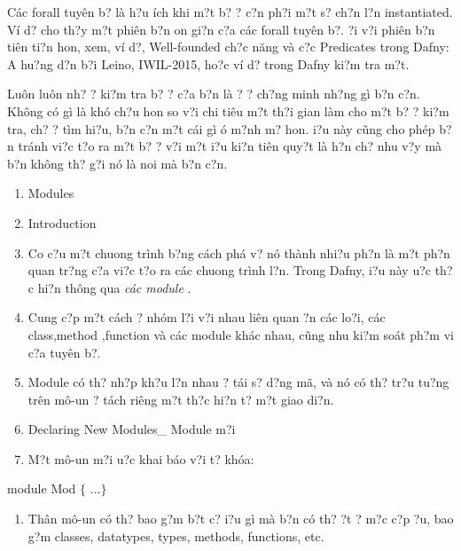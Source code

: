 \documentclass{article} %
\begin{document}
C\'{a}c forall tuy\^{e}n b? l\`{a} h?u \'{i}ch khi m?t b? {\dj}? c?n ph?i m?t s? ch?n l?n instantiated. V\'{i} d? cho th?y m?t phi\^{e}n b?n {\dj}on gi?n c?a c\'{a}c forall tuy\^{e}n b?. {\DJ}?i v?i phi\^{e}n b?n ti\^{e}n ti?n hon, xem, v\'{i} d?, Well-founded ch?c n\u{a}ng v\`{a} c?c Predicates trong Dafny: A hu?ng d?n b?i Leino, IWIL-2015, ho?c v\'{i} d? trong Dafny ki?m tra m?t.

Lu\^{o}n lu\^{o}n nh? {\dj}? ki?m tra b? {\dj}? c?a b?n l\`{a} {\dj}? {\dj}? ch?ng minh nh?ng g\`{i} b?n c?n. Kh\^{o}ng c\'{o} g\`{i} l\`{a} kh\'{o} ch?u hon so v?i chi ti\^{e}u m?t th?i gian l\`{a}m cho m?t b? {\dj}? ki?m tra, ch? {\dj}? t\`{i}m hi?u, b?n c?n m?t c\'{a}i g\`{i} {\dj}\'{o} m?nh m? hon. {\DJ}i?u n\`{a}y c\~{u}ng cho ph\'{e}p b?n tr\'{a}nh vi?c t?o ra m?t b? {\dj}? v?i m?t {\dj}i?u ki?n ti\^{e}n quy?t l\`{a} h?n ch? nhu v?y m\`{a} b?n kh\^{o}ng th? g?i n\'{o} l\`{a} noi m\`{a} b?n c?n.

\noindent 

\begin{enumerate}
\item  Modules

\item  Introduction

\item  Co c?u m?t chuong tr\`{i}nh b?ng c\'{a}ch ph\'{a} v? n\'{o} th\`{a}nh nhi?u ph?n l\`{a} m?t ph?n quan tr?ng c?a vi?c t?o ra c\'{a}c chuong tr\`{i}nh l?n. Trong Dafny, {\dj}i?u n\`{a}y {\dj}u?c th?c hi?n th\^{o}ng qua \textit{c\'{a}c module} .

\item  Cung c?p m?t c\'{a}ch {\dj}? nh\'{o}m l?i v?i nhau li\^{e}n quan {\dj}?n c\'{a}c lo?i, c\'{a}c class,method ,function v\`{a} c\'{a}c module kh\'{a}c nhau, c\~{u}ng nhu ki?m so\'{a}t ph?m vi c?a tuy\^{e}n b?. 

\item  Module c\'{o} th? nh?p kh?u l?n nhau {\dj}? t\'{a}i s? d?ng m\~{a}, v\`{a} n\'{o} c\'{o} th? tr?u tu?ng tr\^{e}n m\^{o}-{\dj}un {\dj}? t\'{a}ch ri\^{e}ng m?t th?c hi?n t? m?t giao di?n.

\item  Declaring New Modules\_ Module m?i

\item  M?t m\^{o}-{\dj}un m?i {\dj}u?c khai b\'{a}o v?i t? kh\'{o}a: 
\end{enumerate}

\noindent module Mod $\{$  ...$\}$

\begin{enumerate}
\item  Th\^{a}n m\^{o}-{\dj}un c\'{o} th? bao g?m b?t c? {\dj}i?u g\`{i} m\`{a} b?n c\'{o} th? {\dj}?t ? m?c c?p {\dj}?u, bao g?m classes, datatypes, types, methods, functions, etc.
\end{enumerate}
\end{document}
